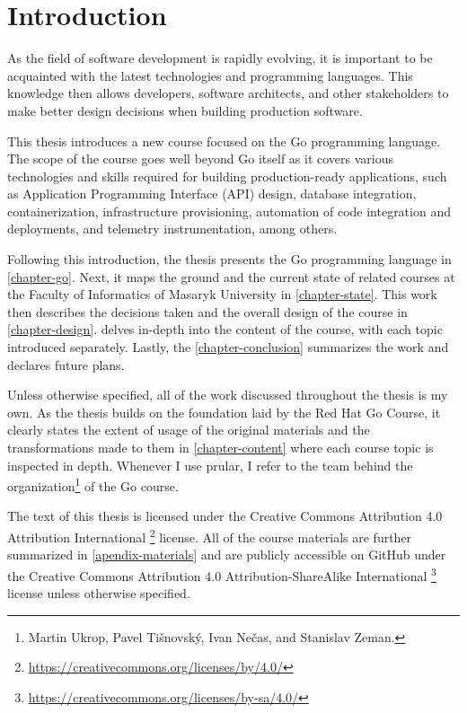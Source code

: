 \documentclass[
  digital,
  color,
  oneside,
  nosansbold,
  nocolorbold,
  nolof,
  nolot,
]{fithesis4}
\begin{document}
\chapter{Introduction}

As the field of software development is rapidly evolving, it is important to be acquainted with the latest technologies and programming languages. This knowledge then allows developers, software architects, and other stakeholders to make better design decisions when building production software.

This thesis introduces a new course focused on the Go\cite{go} programming language. The scope of the course goes well beyond Go itself as it covers various technologies and skills required for building production-ready applications, such as Application Programming Interface (API) design, database integration, containerization, infrastructure provisioning, automation of code integration and deployments, and telemetry instrumentation, among others.

Following this introduction, the thesis presents the Go programming language in \cref{chapter-go}. Next, it maps the ground and the current state of related courses at the Faculty of Informatics of Masaryk University in \cref{chapter-state}. This work then describes the decisions taken and the overall design of the course in \cref{chapter-design}.  delves in-depth into the content of the course, with each topic introduced separately. Lastly, the \cref{chapter-conclusion} summarizes the work and declares future plans.

Unless otherwise specified, all of the work discussed throughout the thesis is my own. As the thesis builds on the foundation laid by the Red Hat Go Course\cite{redhat-go-course}, it clearly states the extent of usage of the original materials and the transformations made to them in \cref{chapter-content} where each course topic is inspected in depth. Whenever I use prular, I refer to the team behind the organization\footnote{Martin Ukrop, Pavel Tišnovský, Ivan Nečas, and Stanislav Zeman.} of the Go course.

The text of this thesis is licensed under the Creative Commons Attribution 4.0 Attribution International \footnote{\url{https://creativecommons.org/licenses/by/4.0/}} license. All of the course materials are further summarized in \cref{apendix-materials} and are publicly accessible on GitHub\cite{github} under the Creative Commons Attribution 4.0 Attribution-ShareAlike International \footnote{\url{https://creativecommons.org/licenses/by-sa/4.0/}} license unless otherwise specified.
\end{document}
